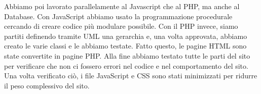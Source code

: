 Abbiamo poi lavorato parallelamente al Javascript che al PHP, ma anche al Database. Con JavaScript abbiamo usato la programmazione procedurale cercando di creare codice più modulare possibile. Con il PHP invece, siamo partiti definendo tramite UML una gerarchia e, una volta approvata, abbiamo creato le varie classi e le abbiamo testate. Fatto questo, le pagine HTML sono state convertite in pagine PHP. Alla fine abbiamo testato tutte le parti del sito per verificare che non ci fossero errori nel codice e nel comportamento del sito. Una volta verificato ciò, i file JavaScript e CSS sono stati minimizzati per ridurre il peso complessivo del sito.